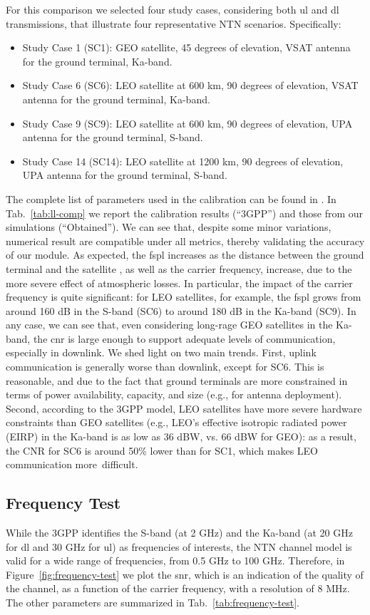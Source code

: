 For this comparison we selected four study cases, considering both \gls{ul} and \gls{dl} transmissions, that illustrate four  representative NTN scenarios. Specifically: 
\begin{itemize}
    \item Study Case 1 (SC1): GEO satellite, 45 degrees of elevation, VSAT antenna for the ground terminal,	Ka-band.
    \item Study Case 6 (SC6): LEO satellite at 600 km, 90 degrees of elevation, VSAT antenna for the ground terminal,	Ka-band.
    \item Study Case 9 (SC9): LEO satellite at 600 km, 90 degrees of elevation, UPA antenna for the ground terminal,	S-band.
    \item Study Case 14 (SC14): LEO satellite at 1200 km, 90 degrees of elevation, UPA antenna for the ground terminal,	S-band.
\end{itemize}
The complete list of parameters used in the calibration can be found in \cite[Section 6.1]{38821}. 
In Tab.~\ref{tab:ll-comp} we report the calibration results (``3GPP'') and those from our simulations (``Obtained''). We can see that, despite some minor variations, numerical result are compatible under all metrics, thereby validating the accuracy of our module. 
As expected, the \gls{fspl} increases as the distance between the ground terminal and the satellite , as well as the carrier frequency, increase, due to the more severe effect of atmospheric losses. In particular, the impact of the carrier frequency is quite significant: for LEO satellites, for example, the \gls{fspl} grows from around 160 dB in the S-band (SC6) to around 180 dB in the Ka-band (SC9). In any case, we can see that,  even considering long-rage GEO satellites in the Ka-band, the \gls{cnr} is large enough to support adequate levels of communication, especially in downlink. 
We shed light on two main trends. First, uplink communication is generally worse than downlink, except for SC6. This is reasonable, and due to the fact that ground terminals are more constrained in terms of power availability, capacity, and size (e.g., for antenna deployment).
Second, according to the 3GPP model, LEO satellites have more severe hardware constraints than GEO satellites (e.g., LEO's effective isotropic radiated power (EIRP) in the Ka-band is as low as 36 dBW, vs. 66 dBW for GEO): as a result, the CNR for SC6 is around 50\% lower than for SC1, which makes LEO communication more~difficult.


\subsection{Frequency Test}
While the 3GPP identifies the S-band (at 2 GHz) and the Ka-band (at 20 GHz for \gls{dl} and 30 GHz for \gls{ul}) as frequencies of interests, the NTN channel model is valid for a wide range of frequencies, from 0.5 GHz to 100 GHz. 
Therefore, in Figure~\ref{fig:frequency-test} we plot the \gls{snr}, which is an indication of the quality of the channel, as a function of the carrier frequency, with a resolution of 8 MHz. The other parameters are summarized in Tab.~\ref{tab:frequency-test}.

